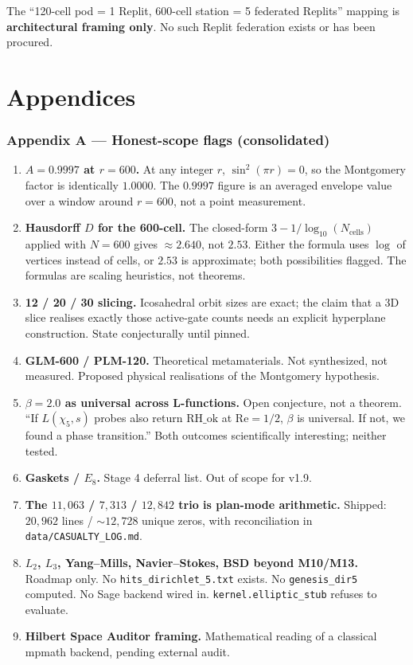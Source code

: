 \documentclass[11pt,letterpaper]{article}
\begin{document}
The ``120-cell pod = 1 Replit, 600-cell station = 5 federated Replits''
mapping is \textbf{architectural framing only}. No such Replit federation
exists or has been procured.

\clearpage
\part{Appendices}

\section*{Appendix A --- Honest-scope flags (consolidated)}

\begin{enumerate}
  \item \textbf{$A = 0.9997$ at $r = 600$.} At any integer $r$, $\sin^2(\pi r) = 0$, so the Montgomery factor is identically $1.0000$. The $0.9997$ figure is an averaged envelope value over a window around $r = 600$, not a point measurement.
  \item \textbf{Hausdorff $D$ for the 600-cell.} The closed-form $3 - 1/\log_{10}(N_{\text{cells}})$ applied with $N = 600$ gives $\approx 2.640$, not $2.53$. Either the formula uses $\log$ of vertices instead of cells, or $2.53$ is approximate; both possibilities flagged. The formulas are scaling heuristics, not theorems.
  \item \textbf{12 / 20 / 30 slicing.} Icosahedral orbit sizes are exact; the claim that a 3D slice realises exactly those active-gate counts needs an explicit hyperplane construction. State conjecturally until pinned.
  \item \textbf{GLM-600 / PLM-120.} Theoretical metamaterials. Not synthesized, not measured. Proposed physical realisations of the Montgomery hypothesis.
  \item \textbf{$\beta = 2.0$ as universal across L-functions.} Open conjecture, not a theorem. ``If $L(\chi_5, s)$ probes also return $\mathrm{RH\_ok}$ at $\mathrm{Re} = 1/2$, $\beta$ is universal. If not, we found a phase transition.'' Both outcomes scientifically interesting; neither tested.
  \item \textbf{Gaskets / $E_8$.} Stage 4 deferral list. Out of scope for v1.9.
  \item \textbf{The $11{,}063$ / $7{,}313$ / $12{,}842$ trio is plan-mode arithmetic.} Shipped: $20{,}962$ lines / ${\sim}12{,}728$ unique zeros, with reconciliation in \texttt{data/CASUALTY\_LOG.md}.
  \item \textbf{$L_2$, $L_3$, Yang--Mills, Navier--Stokes, BSD beyond M10/M13.} Roadmap only. No \texttt{hits\_dirichlet\_5.txt} exists. No \texttt{genesis\_dir5} computed. No Sage backend wired in. \texttt{kernel.elliptic\_stub} refuses to evaluate.
  \item \textbf{Hilbert Space Auditor framing.} Mathematical reading of a classical mpmath backend, pending external audit.
\end{enumerate}
\end{document}
